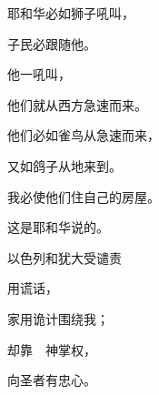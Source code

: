 {\par }{\BB \par }{\Q {}耶和华必如狮子吼叫，
\par }{\Q 子民必跟随他。
\par }{\Q 他一吼叫，
\par }{\Q 他们就从西方急速而来。
\par }{\Q {}他们必如雀鸟从{}急速而来，
\par }{\Q 又如鸽子从{}地来到。
\par }{\Q 我必使他们住自己的房屋。
\par }{\Q 这是耶和华说的。
\par }{\SH 以色列和犹大受谴责
\par }{\Q {}用谎话，
\par }{家用诡计围绕我；
\par }{却靠　神掌权，
\par }{\Q 向圣者有忠心。

}
